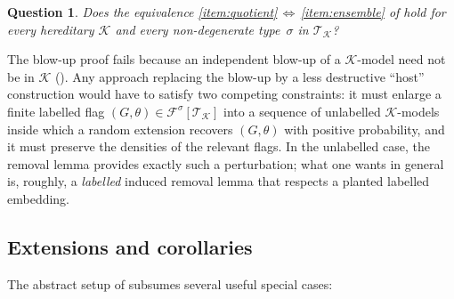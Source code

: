 \documentclass[11pt]{article}
\newtheorem{question}[theorem]{Question}
\theoremstyle{definition}
\newcommand{\F}{\mathcal{F}}
\newcommand{\K}{\mathcal{K}}
\newcommand{\T}{\mathcal{T}}
\begin{document}
\begin{question}\label{q:general}
Does the equivalence \ref{item:quotient}\,$\Leftrightarrow$\,\ref{item:ensemble}
of  hold for every hereditary $\K$ and every non-degenerate
type~$\sigma$ in $\T_\K$?
\end{question}

The blow-up proof fails because an independent blow-up of a $\K$-model
need not be in $\K$ ().  Any approach replacing
the blow-up by a less destructive ``host'' construction would have to
satisfy two competing constraints: it must enlarge a finite labelled
flag $(G,\theta)\in\F^\sigma[\T_\K]$ into a sequence of unlabelled
$\K$-models inside which a random extension recovers $(G,\theta)$ with
positive probability, and it must preserve the densities of the relevant
flags.  In the unlabelled case, the removal lemma provides exactly such
a perturbation; what one wants in general is, roughly, a \emph{labelled}
induced removal lemma that respects a planted labelled embedding.

\subsection{Extensions and corollaries}

The abstract setup of  subsumes several useful special
cases:
\end{document}
